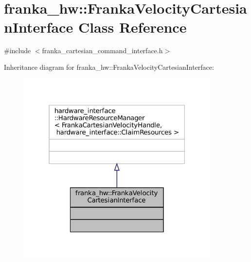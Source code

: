 \hypertarget{classfranka__hw_1_1FrankaVelocityCartesianInterface}{}\section{franka\+\_\+hw\+:\+:Franka\+Velocity\+Cartesian\+Interface Class Reference}
\label{classfranka__hw_1_1FrankaVelocityCartesianInterface}


{\ttfamily \#include $<$franka\+\_\+cartesian\+\_\+command\+\_\+interface.\+h$>$}



Inheritance diagram for franka\+\_\+hw\+:\+:Franka\+Velocity\+Cartesian\+Interface\+:
\nopagebreak
\begin{figure}[H]
\begin{center}
\leavevmode
\includegraphics[width=289pt]{classfranka__hw_1_1FrankaVelocityCartesianInterface__inherit__graph}
\end{center}
\end{figure}


